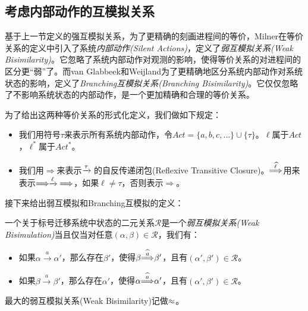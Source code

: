 \subsection{考虑内部动作的互模拟关系}
\label{subsec:silent-bis}

基于上一节定义的强互模拟关系，为了更精确的刻画进程间的等价，Milner在等价关系的定义中引入了系统\emph{内部动作(Silent Actions)}，定义了\emph{弱互模拟关系(Weak Bisimilarity)}\cite{Milner1989}。它忽略了系统内部动作对观测的影响，使得等价关系的对进程间的区分更``弱''了。而van Glabbeek和Weijland为了更精确地区分系统内部动作对系统状态的影响，定义了\emph{Branching互模拟关系(Branching Bisimilarity)}\cite{Glabbeek1996}。它仅仅忽略了不影响系统状态的内部动作，是一个更加精确和合理的等价关系。

为了给出这两种等价关系的形式化定义，我们做如下规定：
\begin{itemize}
    \item 我们用符号$\tau$来表示所有系统内部动作，令$Act=\{a,b,c,\ldots\}\cup\{\tau\}$。$\ell$属于$Act$，$\ell^{*}$属于$Act^{*}$。

    \item 我们用$\Longrightarrow$来表示${\xrightarrow{\tau}{}}$的自反传递闭包(Reflexive Transitive Closure)。${\stackrel{\widehat{\ell}}{\Longrightarrow}}$用来表示${\stackrel{}{\Longrightarrow}}{\xrightarrow{\ell}{}}{\stackrel{}{\Longrightarrow}}$，如果$\ell\not=\tau$，否则表示$\Longrightarrow$。
\end{itemize}

接下来给出弱互模拟和Branching互模拟的定义：
\begin{defn}\label{def:weak-bis}
一个关于标号迁移系统中状态的二元关系$\mathcal{R}$是一个\emph{弱互模拟关系(Weak Bisimulation)}当且仅当对任意$(\alpha,\beta)\in \mathcal{R}$，我们有：
\begin{itemize}
   \item 如果$\alpha\stackrel{a}{\longrightarrow}\alpha'$，那么存在$\beta'$，使得$\beta{\stackrel{\widehat{a}}{\Longrightarrow}}\beta'$，且有$(\alpha',\beta')\in\mathcal{R}$。
   \item 如果$\beta\stackrel{a}{\longrightarrow}\beta'$，那么存在$\alpha'$，使得$\alpha{\stackrel{\widehat{a}}{\Longrightarrow}}\alpha'$，且有$(\alpha',\beta')\in\mathcal{R}$。
\end{itemize}
最大的弱互模拟关系(Weak Bisimilarity)记做$\approx$。
\end{defn}

